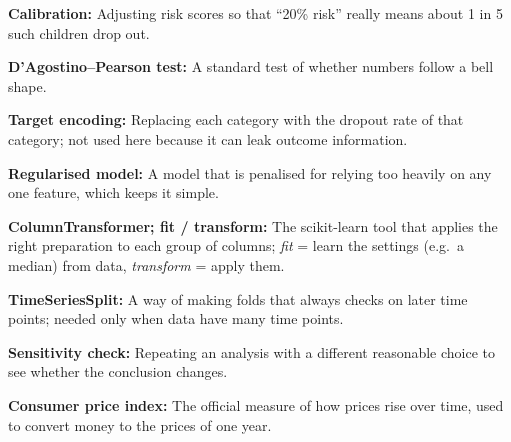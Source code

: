 \documentclass[conference,a4paper]{IEEEtran}
\begin{document}
{\noindent\textbf{Calibration:} Adjusting risk scores so that ``20\% risk'' really means about 1 in 5 such children drop out.\par\vspace{2pt}
\noindent\textbf{D'Agostino--Pearson test:} A standard test of whether numbers follow a bell shape.\par\vspace{2pt}
\noindent\textbf{Target encoding:} Replacing each category with the dropout rate of that category; not used here because it can leak outcome information.\par\vspace{2pt}
\noindent\textbf{Regularised model:} A model that is penalised for relying too heavily on any one feature, which keeps it simple.\par\vspace{2pt}
\noindent\textbf{ColumnTransformer; fit / transform:} The scikit-learn tool that applies the right preparation to each group of columns; \emph{fit} = learn the settings (e.g.\ a median) from data, \emph{transform} = apply them.\par\vspace{2pt}
\noindent\textbf{TimeSeriesSplit:} A way of making folds that always checks on later time points; needed only when data have many time points.\par\vspace{2pt}
\noindent\textbf{Sensitivity check:} Repeating an analysis with a different reasonable choice to see whether the conclusion changes.\par\vspace{2pt}
\noindent\textbf{Consumer price index:} The official measure of how prices rise over time, used to convert money to the prices of one year.\par\vspace{2pt}
}
\end{document}

